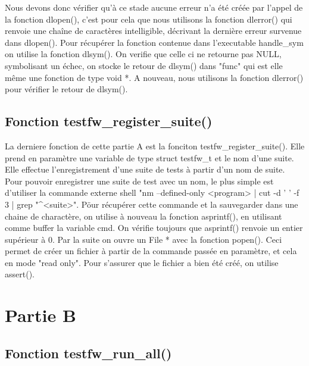 \documentclass{article}
\begin{document}
Nous devons donc vérifier qu'à ce stade aucune erreur n'a été créée par l'appel de la fonction dlopen(), c'est pour cela que nous utilisons la fonction dlerror() qui renvoie une chaîne de caractères intelligible, décrivant la dernière erreur survenue dans dlopen().  Pour récupérer la fonction contenue dans l'executable  handle\_sym on utilise la fonction dlsym(). On verifie que celle ci ne retourne pas NULL,  symbolisant un échec, on stocke le retour de dlsym() dans "func" qui est elle même une fonction de type void *.  A nouveau, nous utilisons la fonction dlerror() pour vérifier le retour de dlsym().



\subsection{Fonction testfw\_register\_suite()}
 La derniere fonction de cette partie A est la fonciton testfw\_register\_suite().  Elle prend en paramètre 
 une variable de type struct testfw\_t et le nom d'une suite.  Elle effectue l'enregistrement d'une suite de tests à partir d'un nom de suite. Pour pouvoir enregistrer une suite de test avec un nom, le plus simple est d'utiliser la commande externe shell "nm --defined-only <program> | cut -d ' ' -f 3 | grep "^<suite>". Pöur récupérer cette commande et la sauvegarder dans une chaine de charactère, on utilise à nouveau la fonction asprintf(), en utilisant comme buffer la variable cmd.  On vérifie toujours que asprintf() renvoie un entier supérieur à 0. Par la suite on ouvre un File * avec la fonction popen(). Ceci permet de créer un fichier à partir de la commande passée en paramètre, et cela en mode "read only". Pour s'assurer que le fichier a bien été créé, on utilise assert().
 
\section{Partie B}
\subsection{Fonction testfw\_run\_all()}
  
\end{document}
